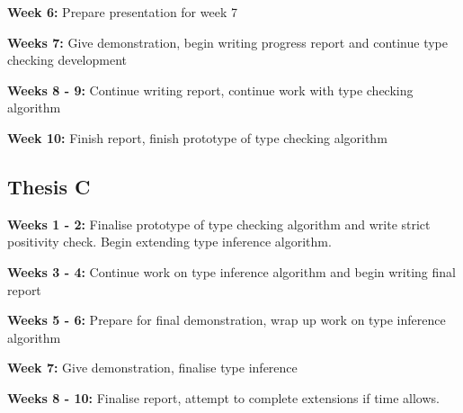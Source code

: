\textbf{Week 6:} Prepare presentation for week 7

\textbf{Weeks 7:} Give demonstration, begin writing progress report and continue type checking development

\textbf{Weeks 8 - 9:} Continue writing report, continue work with type checking algorithm 

\textbf{Week 10:} Finish report, finish prototype of type checking algorithm

\subsection{Thesis C}

\textbf{Weeks 1 - 2:} Finalise prototype of type checking algorithm and write strict positivity check. Begin
extending type inference algorithm.

\textbf{Weeks 3 - 4:} Continue work on type inference algorithm and begin writing final report

\textbf{Weeks 5 - 6:} Prepare for final demonstration, wrap up work on type inference algorithm

\textbf{Week 7:} Give demonstration, finalise type inference

\textbf{Weeks 8 - 10:} Finalise report, attempt to complete extensions if time allows.